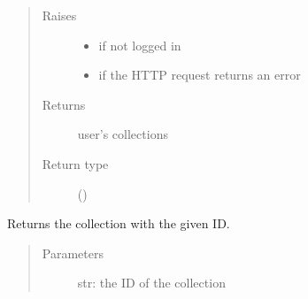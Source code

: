 \documentclass[letterpaper,10pt,english]{sphinxmanual}
\begin{document}
\begin{fulllineitems}
\begin{fulllineitems}
\begin{quote}
\begin{description}
\item[{Raises}] \leavevmode\begin{itemize}
\item {} 
\sphinxAtStartPar
{\hyperref[\detokenize{autoapi/pine/client/exceptions/index:pine.client.exceptions.PineClientAuthException}]{}} \textendash{} if not logged in

\item {} 
\sphinxAtStartPar
{\hyperref[\detokenize{autoapi/pine/client/exceptions/index:pine.client.exceptions.PineClientHttpException}]{}} \textendash{} if the HTTP request returns an error

\end{itemize}

\item[{Returns}] \leavevmode
\sphinxAtStartPar
user’s collections

\item[{Return type}] \leavevmode
\sphinxAtStartPar
{}()

\end{description}\end{quote}

\end{fulllineitems}


\begin{fulllineitems}
\label{\detokenize{autoapi/pine/client/client/index:pine.client.client.PineClient.get_collection}}
\sphinxAtStartPar
Returns the collection with the given ID.
\begin{quote}\begin{description}
\item[{Parameters}] \leavevmode
\sphinxAtStartPar
{} \textendash{} str: the ID of the collection


\end{description}
\end{quote}
\end{fulllineitems}
\end{fulllineitems}
\end{document}
